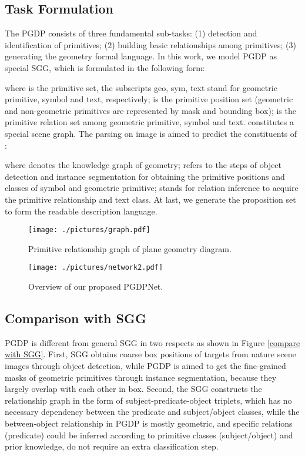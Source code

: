 \documentclass{article}
\begin{document}
\subsection{Task Formulation}
The PGDP consists of three fundamental sub-tasks: (1) detection and identification of primitives; (2) building basic relationships among primitives; (3) generating the geometry formal language. In this work, we model PGDP as special SGG, which is formulated in the following form:

where  is the primitive set, the subscripts geo, sym, text stand for geometric primitive, symbol and text, respectively;  is the primitive position set (geometric and non-geometric primitives are represented by mask and bounding box);  is the primitive relation set among geometric primitive, symbol and text.  constitutes a special scene graph. The parsing on image  is aimed to predict the constituents of :

where  denotes the knowledge graph of geometry;  refers to the steps of object detection and instance segmentation for obtaining the primitive positions and classes of symbol and geometric primitive;  stands for relation inference to acquire the primitive relationship and text class. At last, we generate the proposition set to form the readable description language.  
\begin{figure}[t]
    \begin{center}
    \texttt{[image: ./pictures/graph.pdf]} 
    \end{center}
    \caption{Primitive relationship graph of plane geometry diagram.}
    \label{graph}
\end{figure}

\begin{figure*}[htbp]
    \begin{center}
    \texttt{[image: ./pictures/network2.pdf]} 
    \end{center}
    \vspace{-0.2cm}
    \caption{Overview of our proposed PGDPNet.}
    \label{network}
\end{figure*} 
\subsection{Comparison with SGG}
PGDP is different from general SGG in two respects as shown in Figure \ref{compare with SGG}. First, SGG obtains coarse box positions of targets from nature scene images through object detection, while PGDP is aimed to get the fine-grained masks of geometric primitives through instance segmentation, because they largely overlap with each other in box. Second, the SGG constructs the relationship graph in the form of subject-predicate-object triplets, which has no necessary dependency between the predicate and subject/object classes, while the between-object relationship in PGDP is mostly geometric, and specific relations (predicate) could be inferred according to primitive classes (subject/object) and prior knowledge, do not require an extra classification step.
\end{document}
